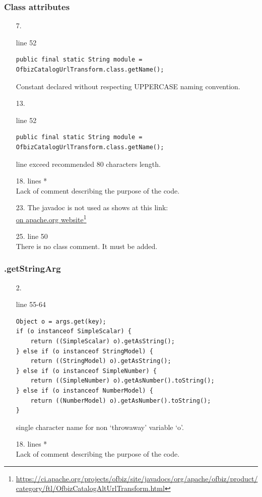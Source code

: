 \documentclass[english]{article}
\newcommand\fnurl[2]{%
	\href{#2}{#1}\footnote{\url{#2}}%
}
\begin{document}
\subsubsection*{Class attributes }	
\begin{itemize}

\item[7.]{line 52
		\begin{lstlisting} 
public final static String module = OfbizCatalogUrlTransform.class.getName();
		\end{lstlisting}
		Constant declared without respecting UPPERCASE naming convention.}

\item[13.]{line 52
		\begin{lstlisting} 
public final static String module = OfbizCatalogUrlTransform.class.getName();
		\end{lstlisting}
		line exceed recommended 80 characters length.}
		
		\item[18.]{lines  *\\
		Lack of comment describing the purpose of the code.}
		
			\item[23.]{The javadoc is not used as shows at this link:\\
\fnurl{on apache.org website}{https://ci.apache.org/projects/ofbiz/site/javadocs/org/apache/ofbiz/product/category/ftl/OfbizCatalogAltUrlTransform.html}}
	\item[25.]{line 50\\
There is no class comment. It must be added.
}
\end{itemize}
	
\subsubsection*{.getStringArg}
\begin{itemize}

\item[2.]{line 55-64
		\begin{lstlisting} 
Object o = args.get(key);
if (o instanceof SimpleScalar) {
    return ((SimpleScalar) o).getAsString();
} else if (o instanceof StringModel) {
    return ((StringModel) o).getAsString();
} else if (o instanceof SimpleNumber) {
    return ((SimpleNumber) o).getAsNumber().toString();
} else if (o instanceof NumberModel) {
    return ((NumberModel) o).getAsNumber().toString();
}
		\end{lstlisting}
		single character name for non `throwaway'  variable `o'.}


\item[18.]{lines  *\\
		Lack of comment describing the purpose of the code.}
\end{itemize}
\end{document}
